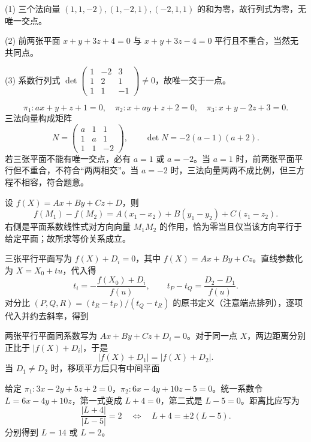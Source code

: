 (1) 三个法向量 $(1,1,-2),(1,-2,1),(-2,1,1)$ 的和为零，故行列式为零，无唯一交点。

(2) 前两张平面 $x+y+3z+4=0$ 与 $x+y+3z-4=0$ 平行且不重合，当然无共同点。

(3) 系数行列式 $\det\begin{pmatrix}1&-2&3\\1&2&1\\1&1&-1\end{pmatrix}\ne0$，故唯一交于一点。

\[
\pi_1:ax+y+z+1=0,\quad \pi_2:x+ay+z+2=0,\quad\pi_3:x+y-2z+3=0.
\]
三法向量构成矩阵
\[
N=\begin{pmatrix}a&1&1\\1&a&1\\1&1&-2\end{pmatrix},\qquad\det N=-2(a-1)(a+2).
\]
若三张平面不能有唯一交点，必有 $a=1$ 或 $a=-2$。当 $a=1$ 时，前两张平面平行但不重合，不符合“两两相交”。当 $a=-2$ 时，三法向量两两不成比例，但三方程不相容，符合题意。

设 $f(X)=Ax+By+Cz+D$，则
\[
f(M_1)-f(M_2)=A(x_1-x_2)+B(y_1-y_2)+C(z_1-z_2).
\]
右侧是平面系数线性式对方向向量 $M_1M_2$ 的作用，恰为零当且仅当该方向平行于给定平面；故所求等价关系成立。

三张平行平面写为 $f(X)+D_i=0$，其中 $f(X)=Ax+By+Cz$。直线参数化为 $X=X_0+t u$，代入得
\[t_i=-\frac{f(X_0)+D_i}{f(u)},\qquad t_P-t_Q=\frac{D_2-D_1}{f(u)}.\]
对分比 $(P,Q,R)=(t_R-t_P)/(t_Q-t_R)$ 的原书定义（注意端点排列），逐项代入并约去斜率，得到

两张平行平面同系数写为 $Ax+By+Cz+D_i=0$。对于同一点 $X$，两边距离分别正比于 $|f(X)+D_i|$，于是
\[
|f(X)+D_1|=|f(X)+D_2|.
\]
当 $D_1\ne D_2$ 时，移项平方后只有中间平面

给定 $\pi_1:3x-2y+5z+2=0$，$\pi_2:6x-4y+10z-5=0$。统一系数令 $L=6x-4y+10z$，第一式变成 $L+4=0$，第二式是 $L-5=0$。距离比应写为
\[
\frac{|L+4|}{|L-5|}=2\quad\Longleftrightarrow\quad L+4=\pm2(L-5).
\]
分别得到 $L=14$ 或 $L=2$。
